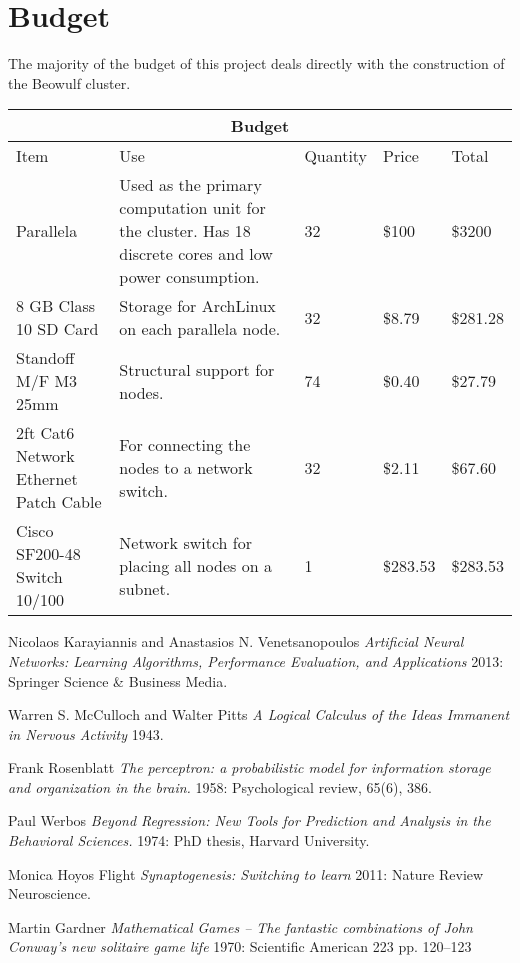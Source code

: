 \documentclass[letter]{article}
\begin{document}
\section{Budget}
The majority of the budget of this project deals directly with the construction of the Beowulf cluster.


\vspace{7mm}
\centering
\begin{tabular}{ |p{2cm}|p{6cm}|p{1.5cm}|p{1cm}| p{1.5cm}|
 }
 \hline
 \multicolumn{5}{|c|}{Budget} \\
 \hline
Item& Use& Quantity&Price & Total\\
 \hline
  Parallela & Used as the primary computation unit for the cluster.  Has 18 discrete cores and low power
  consumption.  & 32 & \$100  & \$3200\\
  \hline
  8 GB Class 10 SD Card & Storage for ArchLinux on each parallela node. &32 &\$8.79 &\$281.28 \\
    \hline
  Standoff M/F M3 25mm &Structural support for nodes. &74 &\$0.40 &\$27.79 \\
    \hline
  2ft Cat6 Network Ethernet Patch Cable & For connecting the nodes to a network switch. &32 &\$2.11 &\$67.60 \\
   \hline
  Cisco SF200-48 Switch 10/100 & Network switch for placing all nodes on a subnet. &1 &\$283.53 &\$283.53 \\

 \hline
\end{tabular}
\begin{thebibliography}{1}
     Nicolaos Karayiannis and Anastasios N. Venetsanopoulos {\em
    Artificial Neural Networks: Learning Algorithms, Performance Evaluation, and Applications} 2013: Springer Science
    \& Business Media.

     Warren S. McCulloch and Walter Pitts {\em A Logical Calculus of the Ideas Immanent in Nervous Activity} 1943.

     Frank Rosenblatt {\em The perceptron: a probabilistic model for information storage and organization in the brain.}
    1958: Psychological review, 65(6), 386.

     Paul Werbos {\em Beyond Regression: New Tools for Prediction and Analysis in the Behavioral Sciences.} 1974: PhD thesis,
    Harvard University.

     Monica Hoyos Flight {\em Synaptogenesis: Switching to learn} 2011: Nature Review Neuroscience.

     Martin Gardner {\em Mathematical Games – The fantastic combinations of John Conway's new solitaire game life} 1970:
     Scientific American 223 pp. 120–123

\end{thebibliography}
\end{document}

